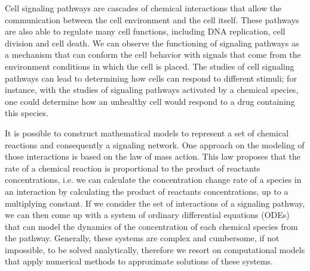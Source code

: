 




Cell signaling pathways are cascades of chemical interactions that 
allow the communication between the cell environment and the 
cell itself. These pathways are also able to regulate many cell 
functions, including DNA replication, cell division and cell death. We
can observe the functioning of signaling pathways as a mechanism that 
can conform the cell behavior with signals that come from the 
environment conditions in which the cell is placed. The studies of cell 
signaling pathways can lead to determining how cells can respond to 
different stimuli; for instance, with the studies of signaling pathways
activated by a chemical species, one could determine how an unhealthy 
cell would respond to a drug containing this species.

It is possible to construct mathematical models to represent a set of
chemical reactions and consequently a signaling network. One approach on 
the modeling of those interactions is based on the law of mass action. 
This law proposes that the rate of a chemical reaction is proportional 
to the product of reactants concentrations, i.e. we can calculate the 
concentration change rate of a species in an interaction by calculating 
the product of reactants concentrations, up to a multiplying constant. 
If we consider the set of interactions of a signaling pathway, we can
then come up with a system of ordinary differential equations (ODEs) 
that can model the dynamics of the concentration of each chemical 
species from the pathway. Generally, these systems are complex and 
cumbersome, if not impossible, to be solved analytically, therefore we 
resort on computational models that apply numerical methods to 
approximate solutions of these systems.

